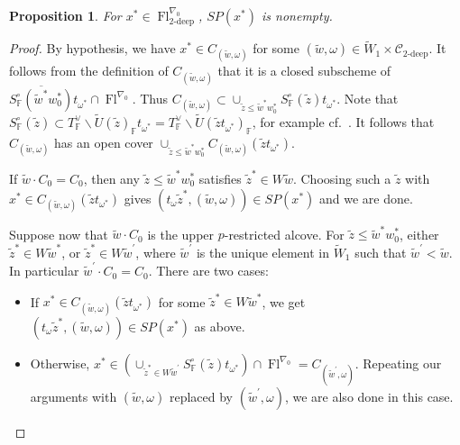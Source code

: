 \documentclass[oneside,a4paper,english, 11pt]{amsart}
\theoremstyle{plain}
\theoremstyle{plain}
\newtheorem{prop}[thm]{Proposition}
\theoremstyle{plain}
\theoremstyle{plain}
\theoremstyle{plain}
\theoremstyle{plain}
\theoremstyle{definition}
\theoremstyle{definition}
\theoremstyle{definition}
\theoremstyle{remark}
\numberwithin{equation}{section}
\newcommand{\F}{\mathbb{F}}
\newcommand{\cC}{\mathcal{C}}
\newcommand{\tld}[1]{\widetilde{#1}}
\newcommand{\ovl}[1]{\overline{#1}}
\DeclareMathOperator{\Fl}{Fl}
\begin{document}
\begin{prop}\label{prop:SPnonempty}
For $x^* \in \Fl_{2\textrm{-deep}}^{\nabla_0}$, $SP(x^*)$ is nonempty. 
\end{prop}
\begin{proof}
By hypothesis, we have $x^*\in C_{(\tld{w},\omega)}$ for some $(\tld{w},\omega) \in \tld{W}_1 \times \cC_{2\text{-deep}}$. It follows from the definition of $C_{(\tld{w},\omega)}$ that it is a closed subscheme of $\ovl{S^{\circ}_\F(\tld{w}^*w_0^*)}t_{\omega^*} \cap \Fl^{\nabla_0}$.
%
Thus $C_{(\tld{w},\omega)}\subset \cup_{\tld{z} \leq \tld{w}^*w_0^*} S^{\circ}_\F(\tld{z})t_{\omega^*}$. Note that $S^{\circ}_\F(\tld{z})\subset  T_\F^\vee\backslash \tld{U}(\tld{z})_{\F}t_{\omega^*}= T_\F^\vee\backslash \tld{U}(\tld{z}t_{\omega^*})_{\F}$, for example cf.~\cite[Proposition 4.2.13]{MLM}. It follows that $C_{(\tld{w},\omega)}$ has an open cover $\cup_{\tld{z} \leq \tld{w}^*w_0^*}C_{(\tld{w},\omega)}(\tld{z}t_{\omega^*})$.

If $\tld{w}\cdot C_0=C_0$, then any $\tld{z}\leq \tld{w}^*w_0^*$ satisfies $\tld{z}^*\in W\tld{w}$. Choosing such a $\tld{z}$ with $x^*\in C_{(\tld{w},\omega)}(\tld{z}t_{\omega^*})$ gives $(t_{\omega}\tld{z}^*,(\tld{w},\omega))\in SP(x^*)$ and we are done.

Suppose now that $\tld{w}\cdot C_0$ is the upper $p$-restricted alcove. For $\tld{z}\leq  \tld{w}^*w_0^*$, either $\tld{z}^*\in W \tld{w}^*$, or $\tld{z}^*\in W\tld{w}^{\prime}$, where $\tld{w}^{\prime}$ is the unique element in $\tld{W}_1$ such that $\tld{w}^\prime < \tld{w}$. In particular $\tld{w}^\prime \cdot C_0=C_0$.
There are two cases:
\begin{itemize}
\item If $x^*\in C_{(\tld{w},\omega)}(\tld{z}t_{\omega^*})$ for some $\tld{z}^*\in W\tld{w}^*$, we get $(t_{\omega}\tld{z}^*,(\tld{w},\omega))\in SP(x^*)$ as above.
\item Otherwise, $x^*\in (\cup_{\tld{z}^*\in W\tld{w}^\prime} S^\circ_{\F}(\tld{z})t_{\omega^*})\cap \Fl^{\nabla_0}=C_{(\tld{w}^\prime,\omega)}$. Repeating our arguments with $(\tld{w},\omega)$ replaced by $(\tld{w}^\prime, \omega)$, we are also done in this case.
\end{itemize}
\end{proof}
%
%


%

%
%
%
\end{document}
